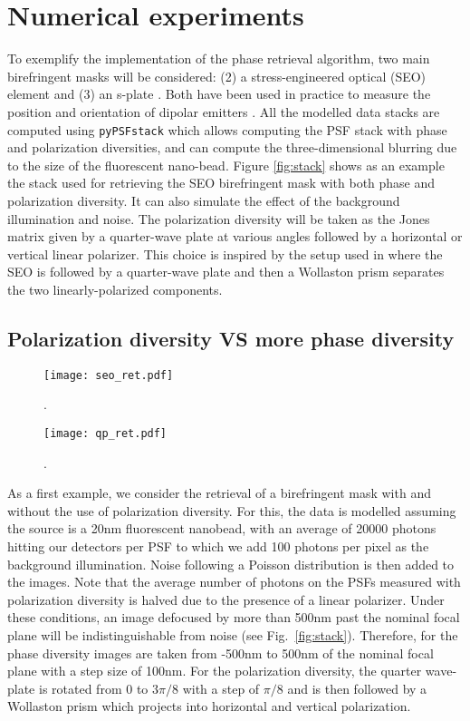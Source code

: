 \documentclass[reprint,aps,pra,superscriptaddress,
amsmath,amssymb]{revtex4-1}
\begin{document}
\section{Numerical experiments}

To exemplify the implementation of the phase retrieval algorithm, 
two main birefringent masks will be considered: (2) a stress-engineered optical 
(SEO) element \cite{} and (3) an s-plate \cite{}. 
Both have been used in practice to measure
the position and orientation of dipolar emitters \cite{}. All the modelled
data stacks are computed using \texttt{pyPSFstack} which allows
computing the PSF stack with phase and polarization diversities, and can 
compute the three-dimensional blurring due to the size of the fluorescent
nano-bead. Figure \ref{fig:stack} shows as an example the stack used for 
retrieving the SEO birefringent mask with both phase and polarization diversity. 
It can also simulate the effect of the background illumination
and noise. The polarization diversity will be taken as the Jones matrix
given by a quarter-wave plate at various angles followed by a horizontal or 
vertical linear polarizer. This choice is inspired by the setup used in \cite{}
where the SEO is followed by a quarter-wave plate and then a Wollaston
prism separates the two linearly-polarized components. 

\subsection{Polarization diversity VS more phase diversity}

\begin{figure}
  \centering
  \texttt{[image: seo\_ret.pdf]}
  \caption{\label{fig:seo_ret} . }
\end{figure}

\begin{figure}
  \centering
  \texttt{[image: qp\_ret.pdf]}
  \caption{\label{fig:qp_ret} . }
\end{figure}

As a first example, we consider the retrieval of a birefringent mask with and without
the use of polarization diversity. For this, the data is modelled assuming 
the source is a 20nm fluorescent nanobead,
with an average of 20000 photons hitting our detectors 
per PSF to which we add 100 photons per pixel 
as the background illumination. Noise following a Poisson distribution
is then added to the images. Note that the average number of photons on the 
PSFs measured with polarization diversity is halved due to the presence of a linear 
polarizer. Under these conditions, an image defocused by more 
than 500nm past the nominal focal plane will be indistinguishable from noise 
(see Fig.~\ref{fig:stack}). 
Therefore, for the phase diversity images are taken from -500nm to 500nm of the 
nominal focal plane with a step size of 100nm. For the polarization diversity, the 
quarter wave-plate is rotated from $0$ to $3\pi/8$ with a step of $\pi/8$ and is
then followed by a Wollaston prism which projects into horizontal and vertical 
polarization.
\end{document}
